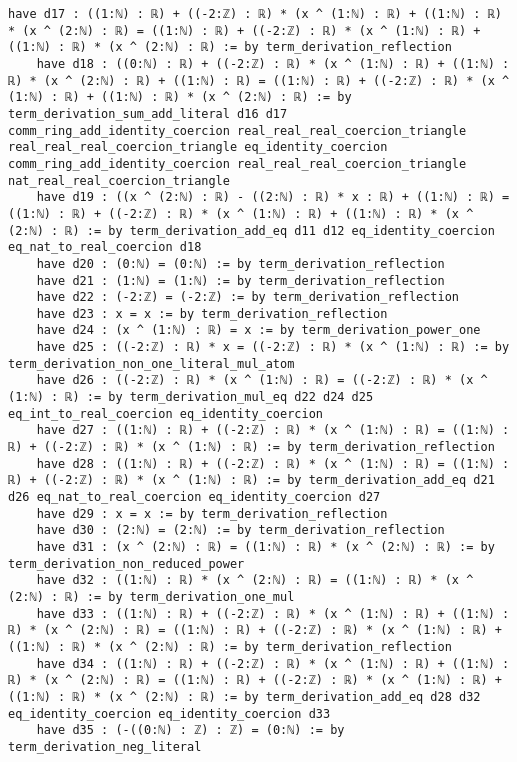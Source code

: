 \documentclass{article}
\begin{document}
\begin{tcolorbox}[colback=white!10, width=\linewidth]
\begin{lstlisting}[language=Lean4]
    have d17 : ((1:ℕ) : ℝ) + ((-2:ℤ) : ℝ) * (x ^ (1:ℕ) : ℝ) + ((1:ℕ) : ℝ) * (x ^ (2:ℕ) : ℝ) = ((1:ℕ) : ℝ) + ((-2:ℤ) : ℝ) * (x ^ (1:ℕ) : ℝ) + ((1:ℕ) : ℝ) * (x ^ (2:ℕ) : ℝ) := by term_derivation_reflection
    have d18 : ((0:ℕ) : ℝ) + ((-2:ℤ) : ℝ) * (x ^ (1:ℕ) : ℝ) + ((1:ℕ) : ℝ) * (x ^ (2:ℕ) : ℝ) + ((1:ℕ) : ℝ) = ((1:ℕ) : ℝ) + ((-2:ℤ) : ℝ) * (x ^ (1:ℕ) : ℝ) + ((1:ℕ) : ℝ) * (x ^ (2:ℕ) : ℝ) := by term_derivation_sum_add_literal d16 d17 comm_ring_add_identity_coercion real_real_real_coercion_triangle real_real_real_coercion_triangle eq_identity_coercion comm_ring_add_identity_coercion real_real_real_coercion_triangle nat_real_real_coercion_triangle
    have d19 : ((x ^ (2:ℕ) : ℝ) - ((2:ℕ) : ℝ) * x : ℝ) + ((1:ℕ) : ℝ) = ((1:ℕ) : ℝ) + ((-2:ℤ) : ℝ) * (x ^ (1:ℕ) : ℝ) + ((1:ℕ) : ℝ) * (x ^ (2:ℕ) : ℝ) := by term_derivation_add_eq d11 d12 eq_identity_coercion eq_nat_to_real_coercion d18
    have d20 : (0:ℕ) = (0:ℕ) := by term_derivation_reflection
    have d21 : (1:ℕ) = (1:ℕ) := by term_derivation_reflection
    have d22 : (-2:ℤ) = (-2:ℤ) := by term_derivation_reflection
    have d23 : x = x := by term_derivation_reflection
    have d24 : (x ^ (1:ℕ) : ℝ) = x := by term_derivation_power_one
    have d25 : ((-2:ℤ) : ℝ) * x = ((-2:ℤ) : ℝ) * (x ^ (1:ℕ) : ℝ) := by term_derivation_non_one_literal_mul_atom
    have d26 : ((-2:ℤ) : ℝ) * (x ^ (1:ℕ) : ℝ) = ((-2:ℤ) : ℝ) * (x ^ (1:ℕ) : ℝ) := by term_derivation_mul_eq d22 d24 d25 eq_int_to_real_coercion eq_identity_coercion
    have d27 : ((1:ℕ) : ℝ) + ((-2:ℤ) : ℝ) * (x ^ (1:ℕ) : ℝ) = ((1:ℕ) : ℝ) + ((-2:ℤ) : ℝ) * (x ^ (1:ℕ) : ℝ) := by term_derivation_reflection
    have d28 : ((1:ℕ) : ℝ) + ((-2:ℤ) : ℝ) * (x ^ (1:ℕ) : ℝ) = ((1:ℕ) : ℝ) + ((-2:ℤ) : ℝ) * (x ^ (1:ℕ) : ℝ) := by term_derivation_add_eq d21 d26 eq_nat_to_real_coercion eq_identity_coercion d27
    have d29 : x = x := by term_derivation_reflection
    have d30 : (2:ℕ) = (2:ℕ) := by term_derivation_reflection
    have d31 : (x ^ (2:ℕ) : ℝ) = ((1:ℕ) : ℝ) * (x ^ (2:ℕ) : ℝ) := by term_derivation_non_reduced_power
    have d32 : ((1:ℕ) : ℝ) * (x ^ (2:ℕ) : ℝ) = ((1:ℕ) : ℝ) * (x ^ (2:ℕ) : ℝ) := by term_derivation_one_mul
    have d33 : ((1:ℕ) : ℝ) + ((-2:ℤ) : ℝ) * (x ^ (1:ℕ) : ℝ) + ((1:ℕ) : ℝ) * (x ^ (2:ℕ) : ℝ) = ((1:ℕ) : ℝ) + ((-2:ℤ) : ℝ) * (x ^ (1:ℕ) : ℝ) + ((1:ℕ) : ℝ) * (x ^ (2:ℕ) : ℝ) := by term_derivation_reflection
    have d34 : ((1:ℕ) : ℝ) + ((-2:ℤ) : ℝ) * (x ^ (1:ℕ) : ℝ) + ((1:ℕ) : ℝ) * (x ^ (2:ℕ) : ℝ) = ((1:ℕ) : ℝ) + ((-2:ℤ) : ℝ) * (x ^ (1:ℕ) : ℝ) + ((1:ℕ) : ℝ) * (x ^ (2:ℕ) : ℝ) := by term_derivation_add_eq d28 d32 eq_identity_coercion eq_identity_coercion d33
    have d35 : (-((0:ℕ) : ℤ) : ℤ) = (0:ℕ) := by term_derivation_neg_literal

\end{lstlisting}
\end{tcolorbox}
\end{document}

